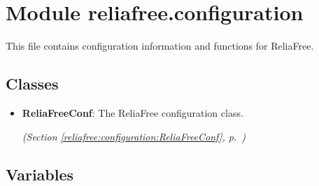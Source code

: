 %
%
%


\section{Module reliafree.configuration}

    \label{reliafree:configuration}
This file contains configuration information and functions for ReliaFree.



\subsection{Classes}

\begin{itemize}  \setlength{\parskip}{0ex}
  \item \textbf{ReliaFreeConf}: The ReliaFree configuration class.



  \textit{(Section \ref{reliafree:configuration:ReliaFreeConf}, p.~\pageref{reliafree:configuration:ReliaFreeConf})}

\end{itemize}


  \subsection{Variables}

